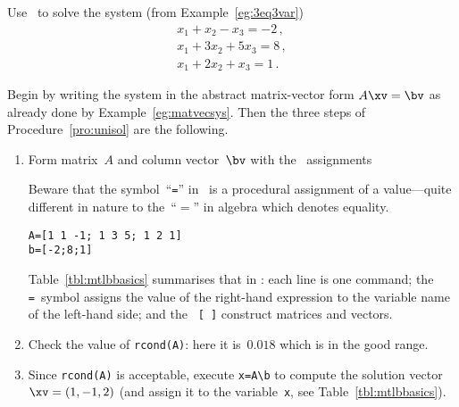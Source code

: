 \begin{example} \label{eg:3eq3varc}
Use \script\ to solve the system (from Example~\ref{eg:3eq3var})
\begin{equation*}
\begin{array}{l}
x_1+x_2-x_3=-2\,,\\
x_1+3x_2+5x_3=8\,,\\
x_1+2x_2+x_3=1\,.
\end{array}
\end{equation*}
\begin{solution} 
Begin by writing the system in the abstract matrix-vector form \(A\xv=\bv\) as already done by Example~\ref{eg:matvecsys}.
Then the three steps of Procedure~\ref{pro:unisol} are the following.
\begin{enumerate}
\item Form matrix~\(A\) and {column vector}~\(\bv\) with the \script\ assignments
\begin{aside}
Beware that the symbol~``\texttt{=}'' in \script\ is a procedural assignment of a value---quite different in nature to the~``\(=\)'' in algebra which denotes equality.
\end{aside}%
\begin{verbatim}
A=[1 1 -1; 1 3 5; 1 2 1]
b=[-2;8;1]
\end{verbatim}
Table~\ref{tbl:mtlbbasics} summarises that in \script: each line is one command; the \verb|=|~symbol assigns the value of the right-hand expression to the variable name of the left-hand side; and the ~\verb|[ ]| construct matrices and vectors.
\item Check the value of \verb|rcond(A)|: here it is~\(0.018\) which is in the good range.
\item Since \verb|rcond(A)| is acceptable,  execute \verb|x=A\b| to compute the solution vector~\(\xv=(1,-1,2)\) (and assign it to the variable~\verb|x|, see Table~\ref{tbl:mtlbbasics}). 

\end{enumerate}
\end{solution}
\end{example}
